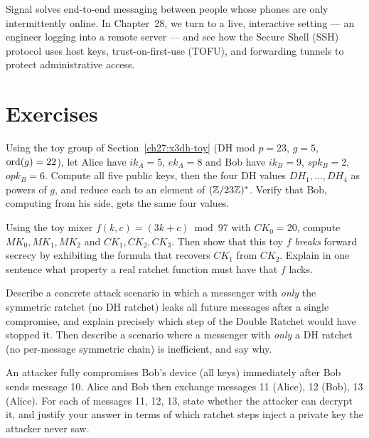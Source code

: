 Signal solves end-to-end messaging between people whose phones are only intermittently
online. In Chapter~28, we turn to a live, interactive setting --- an engineer logging into
a remote server --- and see how the Secure Shell (SSH) protocol uses host keys,
trust-on-first-use (TOFU), and forwarding tunnels to protect administrative access.

\section{Exercises}
\label{ch27:exercises}

\begin{exercise}[X3DH by hand]
Using the toy group of Section~\ref{ch27:x3dh-toy} (DH mod $p=23$, $g=5$, $\operatorname{ord}(g)=22$), let Alice have $ik_A = 5$, $ek_A = 8$ and Bob have $ik_B = 9$, $spk_B = 2$, $opk_B = 6$. Compute all five public keys, then the four DH values $DH_1,\dots,DH_4$ as powers of $g$, and reduce each to an element of $(\mathbb{Z}/23\mathbb{Z})^{*}$. Verify that Bob, computing from his side, gets the same four values.
\end{exercise}

\begin{exercise}
Using the toy mixer $f(k,c) = (3k+c)\bmod 97$ with $CK_0 = 20$, compute $MK_0, MK_1, MK_2$ and $CK_1, CK_2, CK_3$. Then show that this toy $f$ \emph{breaks} forward secrecy by exhibiting the formula that recovers $CK_1$ from $CK_2$. Explain in one sentence what property a real ratchet function must have that $f$ lacks.
\end{exercise}

\begin{exercise}
Describe a concrete attack scenario in which a messenger with \emph{only} the symmetric ratchet (no DH ratchet) leaks all future messages after a single compromise, and explain precisely which step of the Double Ratchet would have stopped it. Then describe a scenario where a messenger with \emph{only} a DH ratchet (no per-message symmetric chain) is inefficient, and say why.
\end{exercise}

\begin{exercise}
An attacker fully compromises Bob's device (all keys) immediately after Bob sends message 10. Alice and Bob then exchange messages 11 (Alice), 12 (Bob), 13 (Alice). For each of messages 11, 12, 13, state whether the attacker can decrypt it, and justify your answer in terms of which ratchet steps inject a private key the attacker never saw.
\end{exercise}


